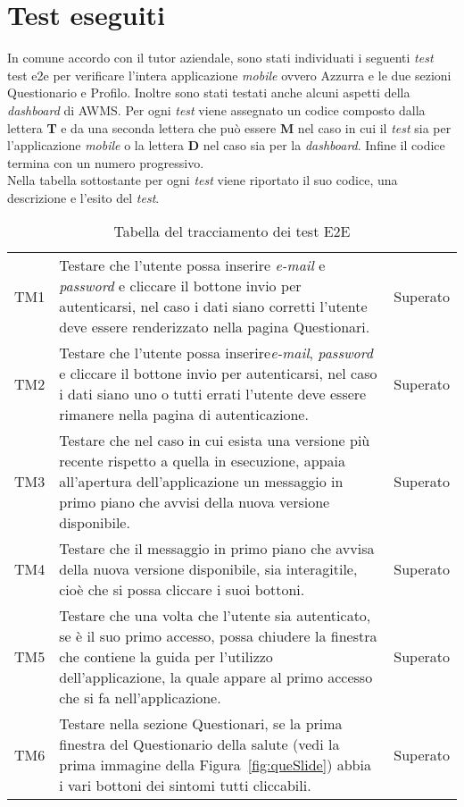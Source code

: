 \section{Test eseguiti}
In comune accordo con il tutor aziendale, sono stati individuati i seguenti \emph{test} \gls{test e2e} per verificare l'intera applicazione \emph{mobile} ovvero Azzurra e le due sezioni Questionario e Profilo. Inoltre sono stati testati anche alcuni aspetti della \emph{dashboard} di \gls{AWMS}. Per ogni \emph{test} viene assegnato un codice composto dalla lettera \textbf{T} e da una seconda lettera che può essere \textbf{M} nel caso in cui il \emph{test} sia per l'applicazione \emph{mobile} o la lettera \textbf{D} nel caso sia per la \emph{dashboard}. Infine il codice termina con un numero progressivo.\\
Nella tabella sottostante per ogni \emph{test} viene riportato il suo codice, una descrizione e l'esito del \emph{test}.
\begin{table}[h]%
	\renewcommand{\arraystretch}{1.4}
	\centering
	\begin{tabularx}{\textwidth}{c X c}
		\hline	
		\rowcolor{heavenly}
		\intest{Codice} &  \intest{Descrizione} & \intest{Esito}\\	
		\hline			
		TM1 & Testare che l'utente possa inserire \emph{e-mail} e \emph{password} e cliccare il bottone invio per autenticarsi, nel caso i dati siano corretti l'utente deve essere renderizzato nella pagina Questionari. & Superato\\
		TM2 & Testare che l'utente possa inserire\emph{e-mail}, \emph{password} e cliccare il bottone invio per autenticarsi, nel caso i dati siano uno o tutti errati l'utente deve essere rimanere nella pagina di autenticazione. & Superato\\
		TM3 & Testare che nel caso in cui esista una versione più recente rispetto a quella in esecuzione, appaia all'apertura dell'applicazione un messaggio in primo piano che avvisi della nuova versione disponibile. & Superato\\
		TM4 & Testare che il messaggio in primo piano che avvisa della nuova versione disponibile, sia interagitile, cioè che si possa cliccare i suoi bottoni. & Superato\\
		TM5 & Testare che una volta che l'utente sia autenticato, se è il suo primo accesso, possa chiudere la finestra che contiene la guida per l'utilizzo dell'applicazione, la quale appare al primo accesso che si fa nell'applicazione. & Superato\\
		TM6 & Testare nella sezione Questionari, se la prima finestra del Questionario della salute (vedi la prima immagine della Figura~\ref{fig:queSlide}) abbia i vari bottoni dei sintomi tutti cliccabili. & Superato\\
		\hline
	\end{tabularx} \hbox{}
	\caption{Tabella del tracciamento dei test E2E}
\end{table}%
	

